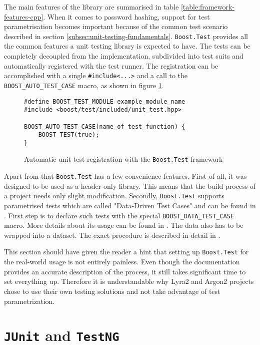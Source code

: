 The main features of the library are summarised in table \ref{table:framework-features-cpp}. When it comes to password hashing, support for test parametrisation becomes important because of the common test scenario described in section \ref{subsec:unit-testing-fundamentals}. \texttt{Boost.Test} provides all the common features a unit testing library is expected to have. The tests can be completely decoupled from the implementation, subdivided  into test suits and automatically registered with the test runner. The registration can be accomplished with a single \texttt{#include<...>} and a call to the \texttt{BOOST_AUTO_TEST_CASE} macro, as shown in figure \ref{figure:boost-auto-test-case}.

\begin{figure}
\centering
\begin{verbatim}
#define BOOST_TEST_MODULE example_module_name
#include <boost/test/included/unit_test.hpp>

BOOST_AUTO_TEST_CASE(name_of_test_function) {
    BOOST_TEST(true);
}
  \end{verbatim}
  \caption{Automatic unit test registration with the \texttt{Boost.Test} framework}
  \label{figure:boost-auto-test-case}
  \end{figure}

Apart from that \texttt{Boost.Test} has a few convenience features. First of all, it was designed to be used as a header-only library. This means that the build process of a project needs only slight modification. Secondly, \texttt{Boost.Test} supports parametrised tests which are called "Data-Driven Test Cases" and can be found in \cite{boost:2017:test-data-driven}. First step is to declare such tests with the special \texttt{BOOST_DATA_TEST_CASE} macro. More details about its usage can be found in \cite{boost:2017:test-docs-data-macro}. The data also has to be wrapped into a dataset. The exact procedure is described in detail in \cite{boost:2017:test-docs-dataset}.

This section should have given the reader a hint that setting up \texttt{Boost.Test} for the real-world usage is not entirely painless. Even though the documentation provides an accurate description of the process, it still takes significant time to set everything up. Therefore it is understandable why Lyra2 and Argon2 projects chose to use their own testing solutions and not take advantage of test parametrization.

\section{\texttt{JUnit} and \texttt{TestNG}}
\label{sec:unit-junit-testng}

